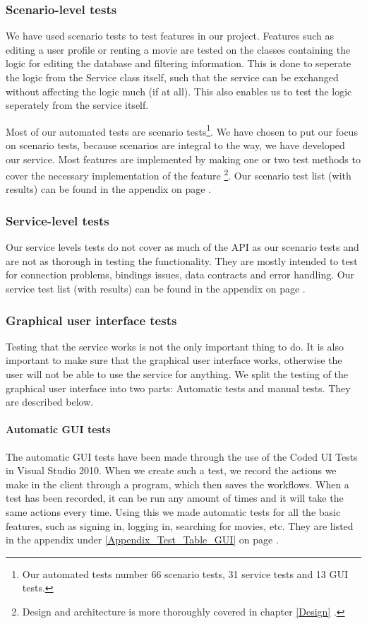 \subsubsection{Scenario-level tests}
\label{Testing_Strategy_Types_Scenario}
We have used scenario tests to test features in our project. Features such as editing a user profile or renting a movie are tested on the classes containing the logic for editing the database and filtering information. This is done to seperate the logic from the Service class itself, such that the service can be exchanged without affecting the logic much (if at all). This also enables us to test the logic seperately from the service itself.

Most of our automated tests are scenario tests\footnote{Our automated tests number 66 scenario tests, 31 service tests and 13 GUI tests.}. We have chosen to put our focus on scenario tests, because scenarios are integral to the way, we have developed our service. Most features are implemented by making one or two test methods to cover the necessary implementation of the feature \footnote{Design and architecture is more thoroughly covered in chapter \ref{Design} .}. Our scenario test list (with results) can be found in the appendix on page \pageref{Appendix_Test_Table_Scenario}.
\subsubsection{Service-level tests}
\label{Testing_Strategy_Types_Service}
Our service levels tests do not cover as much of the API as our scenario tests and are not as thorough in testing the functionality. They are mostly intended to test for connection problems, bindings issues, data contracts and error handling. Our service test list (with results) can be found in the appendix on page \pageref{Appendix_Test_Table_Service}.

\subsubsection{Graphical user interface tests}
\label{Testing_Strategy_Types_EndUser}
Testing that the service works is not the only important thing to do. It is also important to make sure that the graphical user interface works,  otherwise the user will not be able to use the service for anything. We split the testing of the graphical user interface into two parts: Automatic tests and manual tests. They are described below. 

\paragraph{Automatic GUI tests}
The automatic GUI tests have been made through the use of the Coded UI Tests in Visual Studio 2010. When we create such a test, we record the actions we make in the client through a program, which then saves the workflows. When a test has been recorded, it can be run any amount of times and it will take the same actions every time. Using this we made automatic tests for all the basic features, such as signing in, logging in, searching for movies, etc. They are listed in the appendix under \ref{Appendix_Test_Table_GUI} on page \pageref{Appendix_Test_Table_GUI}.

